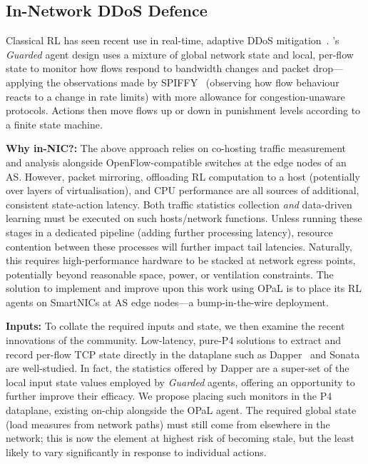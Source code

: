 \documentclass[
sigconf,natbib=false
]{acmart}
\newcommand{\fakepara}[1]{\noindent\textbf{#1:}}
\newcommand{\approachshort}{OPaL}
\begin{document}

\subsection{In-Network DDoS Defence}\label{sec:integ-1}
Classical RL has seen recent use in real-time, adaptive DDoS mitigation~\parencite{DBLP:journals/tnsm/SimpsonRP20}.
's \emph{Guarded} agent design uses a mixture of global network state and local, per-flow state to monitor how flows respond to bandwidth changes and packet drop---applying the observations made by SPIFFY~\parencite{DBLP:conf/ndss/KangGS16} (observing how flow behaviour reacts to a change in rate limits) with more allowance for congestion-unaware protocols.
Actions then move flows up or down in punishment levels according to a finite state machine.

\fakepara{Why in-NIC?}
The above approach relies on co-hosting traffic measurement and analysis alongside OpenFlow-compatible switches at the edge nodes of an AS.
However, packet mirroring, offloading RL computation to a host (potentially over layers of virtualisation), and CPU performance are all sources of additional, consistent state-action latency.
Both traffic statistics collection \emph{and} data-driven learning must be executed on such hosts/network functions.
Unless running these stages in a dedicated pipeline (adding further processing latency), resource contention between these processes will further impact tail latencies.
Naturally, this requires high-performance hardware to be stacked at network egress points, potentially beyond reasonable space, power, or ventilation constraints.
The solution to implement and improve upon this work using \approachshort{} is to place its RL agents on SmartNICs at AS edge nodes---a bump-in-the-wire deployment.


\fakepara{Inputs}
To collate the required inputs and state, we then examine the recent innovations of the community.
Low-latency, pure-P4 solutions to extract and record per-flow TCP state directly in the dataplane such as Dapper~\parencite{DBLP:conf/sosr/GhasemiBR17} and Sonata~\parencite{DBLP:conf/sigcomm/GuptaHCFRW18} are well-studied.
In fact, the statistics offered by Dapper are a super-set of the local input state values employed by \emph{Guarded} agents, offering an opportunity to further improve their efficacy. 
We propose placing such monitors in the P4 dataplane, existing on-chip alongside the \approachshort{} agent.
The required global state (load measures from network paths) must still come from elsewhere in the network; this is now the element at highest risk of becoming stale, but the least likely to vary significantly in response to individual actions.
\end{document}
